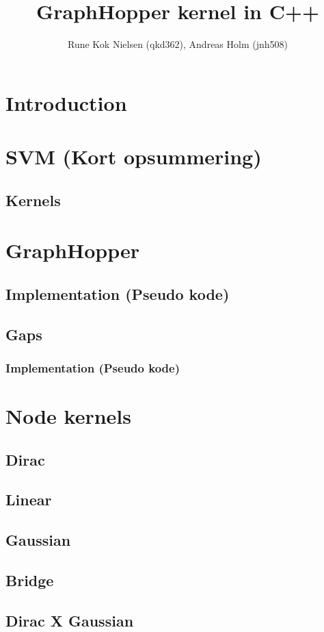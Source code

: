 \documentclass{article}
\author{Rune Kok Nielsen (qkd362), Andreas Holm (jnh508)}
\title{GraphHopper kernel in C++}
\begin{document}
	
\maketitle

\section{Introduction}

\section{SVM (Kort opsummering)}
\subsection{Kernels}

\section{GraphHopper}
\subsection{Implementation (Pseudo kode)}
\subsection{Gaps}
\subsubsection{Implementation (Pseudo kode)}

\section{Node kernels}
\subsection{Dirac}
\subsection{Linear}
\subsection{Gaussian}
\subsection{Bridge}
\subsection{Dirac X Gaussian}
\end{document}
